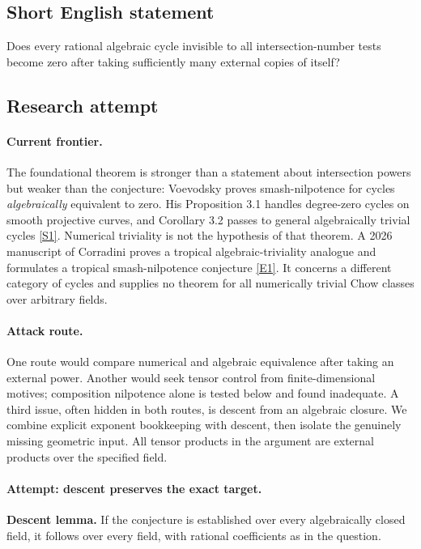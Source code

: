 \documentclass[11pt,a4paper]{article}
\newcommand{\sref}[2]{\hyperlink{source:#1:#2}{[S#2]}}
\newcommand{\eref}[2]{\hyperlink{extra:#1:#2}{[E#2]}}
\numberwithin{equation}{section}
\begin{document}
\subsection{Short English statement}
Does every rational algebraic cycle invisible to all intersection-number tests become zero after taking sufficiently many external copies of itself?
\subsection{Research attempt}

\paragraph{Current frontier.}
The foundational theorem is stronger than a statement about intersection
powers but weaker than the conjecture: Voevodsky proves smash-nilpotence
for cycles \emph{algebraically} equivalent to zero. His Proposition 3.1
handles degree-zero cycles on smooth projective curves, and Corollary 3.2
passes to general algebraically trivial cycles \sref{30006776}{1}.
Numerical triviality is not the hypothesis of that theorem. A 2026
manuscript of Corradini proves a tropical algebraic-triviality analogue
and formulates a tropical smash-nilpotence conjecture \eref{30006776}{1}.
It concerns a different category of cycles and supplies no theorem for
all numerically trivial Chow classes over arbitrary fields.

\paragraph{Attack route.}
One route would compare numerical and algebraic equivalence after taking
an external power. Another would seek tensor control from finite-dimensional
motives; composition nilpotence alone is tested below and found inadequate.
A third issue, often hidden in both routes, is descent from an algebraic
closure. We combine explicit exponent bookkeeping with descent, then
isolate the genuinely missing geometric input. All tensor products in the
argument are external products over the specified field.

\paragraph{Attempt: descent preserves the exact target.}
\textbf{Descent lemma.} If the conjecture is established over every
algebraically closed field, it follows over every field, with rational
coefficients as in the question.
\end{document}
